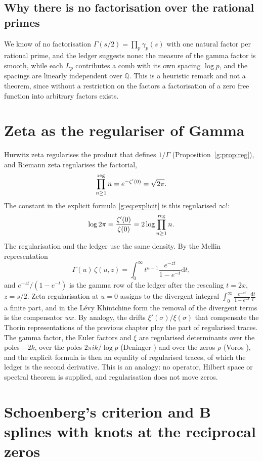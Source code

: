 \subsection{Why there is no factorisation over the rational primes}

We know of no factorisation $\Gamma(s/2)=\prod_p\gamma_p(s)$ with one natural factor per rational prime, and the ledger suggests none: the measure of the gamma factor is smooth, while each $L_p$ contributes a comb with its own spacing $\log p$, and the spacings are linearly independent over $\mathbb Q$. This is a heuristic remark and not a theorem, since without a restriction on the factors a factorisation of a zero free function into arbitrary factors exists.

\section{Zeta as the regulariser of Gamma}\label{g:sec:reg}

Hurwitz zeta regularises the product that defines $1/\Gamma$ (Proposition~\ref{g:prop:reg}), and Riemann zeta regularises the factorial,
\[
\prod^{\rm reg}_{n\ge1}n=e^{-\zeta'(0)}=\sqrt{2\pi}.
\]
The constant in the explicit formula \eqref{g:eq:explicit} is this regularised $\infty!$:
\[
\log2\pi=\frac{\zeta'(0)}{\zeta(0)}=2\log\prod^{\rm reg}_{n\ge1}n .
\]
The regularisation and the ledger use the same density. By the Mellin representation
\[
\Gamma(u)\,\zeta(u,z)=\int_0^\infty t^{u-1}\frac{e^{-zt}}{1-e^{-t}}\mathrm dt,
\]
and $e^{-zt}/(1-e^{-t})$ is the gamma row of the ledger after the rescaling $t=2x$, $z=s/2$. Zeta regularisation at $u=0$ assigns to the divergent integral $\int_0^\infty\frac{e^{-zt}}{1-e^{-t}}\frac{\mathrm dt}{t}$ a finite part, and in the L\'evy Khintchine form the removal of the divergent terms is the compensator $wx$. By analogy, the drifts $\xi'(\sigma)/\xi(\sigma)$ that compensate the Thorin representations of the previous chapter play the part of regularised traces. The gamma factor, the Euler factors and $\xi$ are regularised determinants over the poles $-2k$, over the poles $2\pi ik/\log p$ (Deninger \cite{Deninger92}) and over the zeros $\rho$ (Voros \cite{Voros10}), and the explicit formula is then an equality of regularised traces, of which the ledger is the second derivative. This is an analogy: no operator, Hilbert space or spectral theorem is supplied, and regularisation does not move zeros.
\section{Schoenberg's criterion and B splines with knots at the reciprocal zeros}\label{g:sec:pf}


